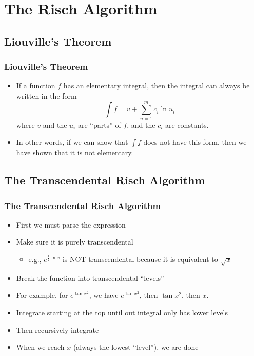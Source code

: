 \documentclass{beamer}
\numberwithin{equation}{section} %
\begin{document}
\section{The Risch Algorithm}

\subsection{Liouville's Theorem}

\begin{frame}
    \frametitle{Liouville's Theorem}
    \begin{itemize}
        \item If a function $f$ has an elementary integral, then the
        integral can always be written in the form
        \begin{equation}
            \label{liouville's theorem}
            \int{f} = v + \sum_{n=1}^m{c_i\ln{u_i}}
        \end{equation}
        where $v$ and the $u_i$ are ``parts'' of $f$, and the $c_i$ are
        constants.
        \pause
        \item In other words, if we can show that $\int{f}$ does not
        have this form, then we have shown that it is not elementary.
    \end{itemize}
\end{frame}

\subsection{The Transcendental Risch Algorithm}

\begin{frame}
    \frametitle{The Transcendental Risch Algorithm}
    \begin{itemize}
        \item First we must parse the expression
        \item Make sure it is purely transcendental
        \begin{itemize}
            \item e.g., $e^{\frac{1}{2}\ln{x}}$ is NOT transcendental
            because it is equivalent to $\sqrt{x}$
        \end{itemize}
    \pause
    \item Break the function into transcendental ``levels''
    \item For example, for $e^{\tan{x^2}}$, we have $e^{\tan{x^2}}$,
    then $\tan{x^2}$, then $x$.
    \pause
    \item Integrate starting at the top until out integral only has
    lower levels
    \item Then recursively integrate
    \item When we reach $x$ (always the lowest ``level''), we are done
    \end{itemize}
\end{frame}
\end{document}
